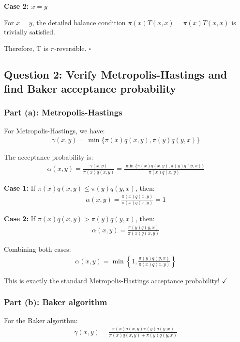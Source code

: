 \textbf{Case 2: $x = y$}

For $x = y$, the detailed balance condition $\pi(x)T(x,x) = \pi(x)T(x,x)$ is trivially satisfied.

Therefore, T is $\pi$-reversible. $\square$

\subsection*{Question 2: Verify Metropolis-Hastings and find Baker acceptance probability}

\subsubsection*{Part (a): Metropolis-Hastings}

For Metropolis-Hastings, we have:
\begin{align*}
\gamma(x,y) = \min\{\pi(x)q(x,y), \pi(y)q(y,x)\}
\end{align*}

The acceptance probability is:
\begin{align*}
\alpha(x,y) = \frac{\gamma(x,y)}{\pi(x)q(x,y)} = \frac{\min\{\pi(x)q(x,y), \pi(y)q(y,x)\}}{\pi(x)q(x,y)}
\end{align*}

\textbf{Case 1:} If $\pi(x)q(x,y) \leq \pi(y)q(y,x)$, then:
\begin{align*}
\alpha(x,y) = \frac{\pi(x)q(x,y)}{\pi(x)q(x,y)} = 1
\end{align*}

\textbf{Case 2:} If $\pi(x)q(x,y) > \pi(y)q(y,x)$, then:
\begin{align*}
\alpha(x,y) = \frac{\pi(y)q(y,x)}{\pi(x)q(x,y)}
\end{align*}

Combining both cases:
\begin{align*}
\alpha(x,y) = \min\left\{1, \frac{\pi(y)q(y,x)}{\pi(x)q(x,y)}\right\}
\end{align*}

This is exactly the standard Metropolis-Hastings acceptance probability! $\checkmark$

\subsubsection*{Part (b): Baker algorithm}

For the Baker algorithm:
\begin{align*}
\gamma(x,y) = \frac{\pi(x)q(x,y)\pi(y)q(y,x)}{\pi(x)q(x,y) + \pi(y)q(y,x)}
\end{align*}

